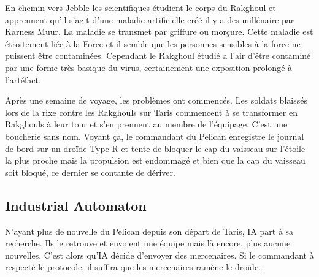 \documentclass{jdrp}
\begin{document}
En chemin vers Jebble les scientifiques étudient le corps du Rakghoul et apprennent qu'il s'agit d'une maladie artificielle créé il y a des millénaire par Karness Muur. La maladie se transmet par griffure ou morçure. Cette maladie est étroitement liée à la Force et il semble que les personnes sensibles à la force ne puissent être contaminées. Cependant le Rakghoul étudié a l'air d'être contaminé par une forme très basique du virus, certainement une exposition prolongé à l'artéfact.

Après une semaine de voyage, les problèmes ont commencés. Les soldats blaissés lors de la rixe contre les Rakghouls sur Taris commencent à se transformer en Rakghouls à leur tour et s'en prennent au membre de l'équipage. C'est une boucherie sans nom. Voyant ça, le commandant du Pelican enregistre le journal de bord sur un droïde Type R et tente de bloquer le cap du vaisseau sur l'étoile la plus proche mais la propulsion est endommagé et bien que la cap du vaisseau soit bloqué, ce dernier se contante de dériver.

\subsection{Industrial Automaton}
N'ayant plus de nouvelle du Pelican depuis son départ de Taris, IA part à sa recherche. Ils le retrouve et envoient une équipe mais là encore, plus aucune nouvelles. C'est alors qu'IA décide d'envoyer des mercenaires. Si le commandant à respecté le protocole, il suffira que les mercenaires ramène le droïde\ldots
\end{document}
